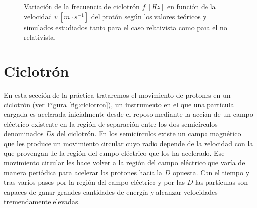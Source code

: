 \documentclass[journal]{IEEEtran}
\begin{document}
\begin{figure}[!htb]
    \caption{Variación de la frecuencia de ciclotrón $f~[Hz]$ en función de la velocidad $v~[m\cdot s^{-1}]$ del protón según los valores teóricos y simulados estudiados tanto para el caso relativista como para el no relativista.}
    \label{fig:relativista_norelativista}
\end{figure}


\newpage

\section{Ciclotrón}
\label{sec:ciclotron}

En esta sección de la práctica trataremos el movimiento de protones en un ciclotrón (ver Figura \ref{fig:ciclotron}), un instrumento en el que una partícula cargada es acelerada inicialmente desde el reposo mediante la acción de un campo eléctrico existente en la región de separación entre los dos semicírculos denominados $Ds$ del ciclotrón. En los semicírculos existe un campo magnético que les produce un movimiento circular cuyo radio depende de la velocidad con la que provengan de la región del campo eléctrico que los ha acelerado. Ese movimiento circular les hace volver a la región del campo eléctrico que varía de manera periódica para acelerar los protones hacia la $D$ opuesta. Con el tiempo y tras varios pasos por la región del campo eléctrico y por las $D$ las partículas son capaces de ganar grandes cantidades de energía y alcanzar velocidades tremendamente elevadas.
\end{document}
